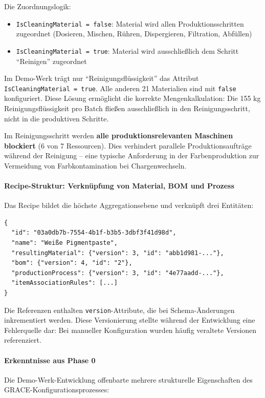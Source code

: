Die Zuordnungslogik:
\begin{itemize}
    \item \texttt{IsCleaningMaterial = false}: Material wird allen Produktionsschritten zugeordnet (Dosieren, Mischen, Rühren, Dispergieren, Filtration, Abfüllen)
    \item \texttt{IsCleaningMaterial = true}: Material wird ausschließlich dem Schritt ``Reinigen'' zugeordnet
\end{itemize}

Im Demo-Werk trägt nur ``Reinigungsflüssigkeit'' das Attribut \texttt{IsCleaningMaterial = true}. Alle anderen 21 Materialien sind mit \texttt{false} konfiguriert. Diese Lösung ermöglicht die korrekte Mengenkalkulation: Die 155 kg Reinigungsflüssigkeit pro Batch fließen ausschließlich in den Reinigungsschritt, nicht in die produktiven Schritte.

Im Reinigungsschritt werden \textbf{alle produktionsrelevanten Maschinen blockiert} (6 von 7 Ressourcen). Dies verhindert parallele Produktionsaufträge während der Reinigung -- eine typische Anforderung in der Farbenproduktion zur Vermeidung von Farbkontamination bei Chargenwechseln.


\paragraph{Recipe-Struktur: Verknüpfung von Material, BOM und Prozess}

Das Recipe bildet die höchste Aggregationsebene und verknüpft drei Entitäten:

\begin{verbatim}
{
  "id": "03a0db7b-7554-4b1f-b3b5-3dbf3f41d98d",
  "name": "Weiße Pigmentpaste",
  "resultingMaterial": {"version": 3, "id": "abb1d981-..."},
  "bom": {"version": 4, "id": "2"},
  "productionProcess": {"version": 3, "id": "4e77aadd-..."},
  "itemAssociationRules": [...]
}
\end{verbatim}

Die Referenzen enthalten \texttt{version}-Attribute, die bei Schema-Änderungen inkrementiert werden. Diese Versionierung stellte während der Entwicklung eine Fehlerquelle dar: Bei manueller Konfiguration wurden häufig veraltete Versionen referenziert.


\paragraph{Erkenntnisse aus Phase 0}

Die Demo-Werk-Entwicklung offenbarte mehrere strukturelle Eigenschaften des GRACE-Konfigurationsprozesses:

